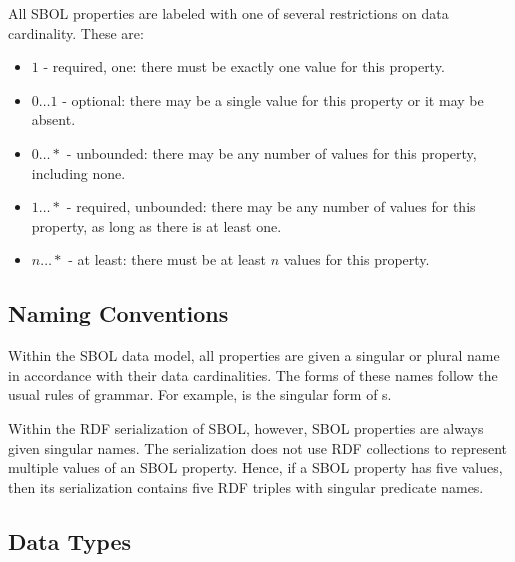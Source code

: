 All SBOL properties are labeled with one of several restrictions on data cardinality. These are:

\begin{itemize}

\item $1$ - required, one: there must be exactly one value for this property.

\item $0 \ldots 1$ - optional: there may be a single value for this property or it may be absent.

\item $0 \ldots *$ - unbounded: there may be any number of values for this property, including none.

\item $1 \ldots *$ - required, unbounded: there may be any number of values for this property, as long as there is at least one.

\item $n \ldots *$ - at least: there must be at least $n$ values for this property.

\end{itemize}

\subsection{Naming Conventions}


Within the SBOL data model, all properties are given a singular or plural name in accordance with their data cardinalities. The forms of these names follow the usual rules of grammar. For example,  is the singular form of s.

Within the RDF serialization of SBOL, however, SBOL properties are always given singular names. The serialization does not use RDF collections to represent multiple values of an SBOL property. Hence, if a SBOL property has five values, then its serialization contains five RDF triples with singular predicate names.

\subsection{Data Types}



